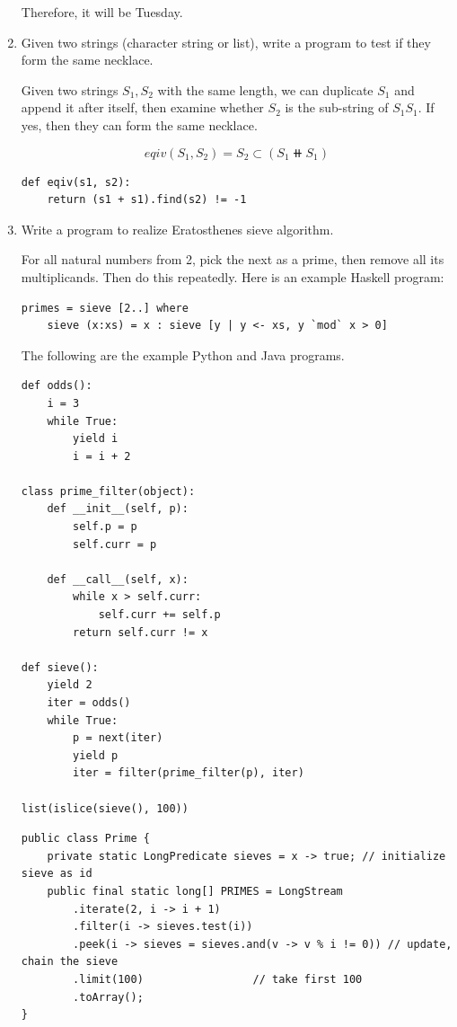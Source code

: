 \documentclass[UTF8]{article}
\begin{document}
\begin{enumerate}
Therefore, it will be Tuesday.

\item {Given two strings (character string or list), write a program to test if they form the same necklace.}

Given two strings $S_1, S_2$ with the same length, we can duplicate $S_1$ and append it after itself, then examine whether $S_2$ is the sub-string of $S_1S_1$. If yes, then they can form the same necklace.

\[
eqiv(S_1, S_2) = S_2 \subset (S_1 \doubleplus S_1)
\]

\lstset{language=Python, frame=single}
\begin{lstlisting}
def eqiv(s1, s2):
    return (s1 + s1).find(s2) != -1
\end{lstlisting}

\item {Write a program to realize Eratosthenes sieve algorithm.}

For all natural numbers from 2, pick the next as a prime, then remove all its multiplicands. Then do this repeatedly. Here is an example Haskell program:

\lstset{language=Haskell}
\begin{lstlisting}
primes = sieve [2..] where
    sieve (x:xs) = x : sieve [y | y <- xs, y `mod` x > 0]
\end{lstlisting}

The following are the example Python and Java programs.

\lstset{language=Python}
\begin{lstlisting}
def odds():
    i = 3
    while True:
        yield i
        i = i + 2

class prime_filter(object):
    def __init__(self, p):
        self.p = p
        self.curr = p

    def __call__(self, x):
        while x > self.curr:
            self.curr += self.p
        return self.curr != x

def sieve():
    yield 2
    iter = odds()
    while True:
        p = next(iter)
        yield p
        iter = filter(prime_filter(p), iter)

list(islice(sieve(), 100))
\end{lstlisting}

\lstset{language=Java}
\begin{lstlisting}
public class Prime {
    private static LongPredicate sieves = x -> true; // initialize sieve as id
    public final static long[] PRIMES = LongStream
        .iterate(2, i -> i + 1)
        .filter(i -> sieves.test(i))
        .peek(i -> sieves = sieves.and(v -> v % i != 0)) // update, chain the sieve
        .limit(100)                 // take first 100
        .toArray();
}
\end{lstlisting}


\end{enumerate}
\end{document}
